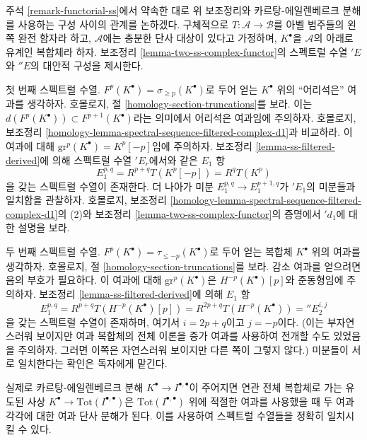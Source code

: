 \begin{remark}
\label{remark-final-functorial}
주석 \ref{remark-functorial-ss}에서 약속한 대로 위 보조정리와
카르탕-에일렌베르크 분해를 사용하는 구성 사이의 관계를 논하겠다.
구체적으로 $T : \mathcal{A} \to \mathcal{B}$를 아벨 범주들의 왼쪽
완전 함자라 하고, $\mathcal{A}$에는 충분한 단사 대상이 있다고
가정하며, $K^\bullet$을 $\mathcal{A}$의 아래로 유계인 복합체라 하자.
보조정리 \ref{lemma-two-ss-complex-functor}의 스펙트럴 수열
${}'E$와 ${}''E$의 대안적 구성을 제시한다.

\medskip\noindent
첫 번째 스펙트럴 수열. $F^p(K^\bullet) =
\sigma_{\geq p}(K^\bullet)$로 두어 얻는 $K^\bullet$ 위의 ``어리석은''
여과를 생각하자. 호몰로지, 절 \ref{homology-section-truncations}를 보라.
이는 $d(F^p(K^\bullet)) \subset F^{p + 1}(K^\bullet)$라는 의미에서
어리석은 여과임에 주의하자. 호몰로지, 보조정리
\ref{homology-lemma-spectral-sequence-filtered-complex-d1}과 비교하라.
이 여과에 대해 $\text{gr}^p(K^\bullet) = K^p[-p]$임에 주의하자.
보조정리 \ref{lemma-ss-filtered-derived}에 의해 스펙트럴 수열
${}'E_r$에서와 같은 $E_1$ 항
$$
E_1^{p, q} = R^{p + q}T(K^p[-p]) = R^qT(K^p)
$$
을 갖는 스펙트럴 수열이 존재한다. 더 나아가 미분
$E_1^{p, q} \to E_1^{p + 1, q}$가 $'{}E_1$의 미분들과 일치함을
관찰하자. 호몰로지, 보조정리
\ref{homology-lemma-spectral-sequence-filtered-complex-d1}의 (2)와
보조정리 \ref{lemma-two-ss-complex-functor}의 증명에서 ${}'d_1$에 대한
설명을 보라.

\medskip\noindent
두 번째 스펙트럴 수열. $F^p(K^\bullet) =
\tau_{\leq -p}(K^\bullet)$로 두어 얻는 복합체 $K^\bullet$ 위의 여과를
생각하자. 호몰로지, 절 \ref{homology-section-truncations}를 보라.
감소 여과를 얻으려면 음의 부호가 필요하다. 이 여과에 대해
$\text{gr}^p(K^\bullet)$은 $H^{-p}(K^\bullet)[p]$와 준동형임에
주의하자. 보조정리 \ref{lemma-ss-filtered-derived}에 의해 $E_1$ 항
$$
E_1^{p, q} = R^{p + q}T(H^{-p}(K^\bullet)[p])
= R^{2p + q}T(H^{-p}(K^\bullet)) = {}''E_2^{i, j}
$$
을 갖는 스펙트럴 수열이 존재하며, 여기서 $i = 2p + q$이고
$j = -p$이다. (이는 부자연스러워 보이지만 여과 복합체의 전체 이론을
증가 여과를 사용하여 전개할 수도 있었음을 주의하자. 그러면 이쪽은
자연스러워 보이지만 다른 쪽이 그렇지 않다.) 미분들이 서로 일치한다는
확인은 독자에게 맡긴다.

\medskip\noindent
실제로 카르탕-에일렌베르크 분해
$K^\bullet \to I^{\bullet, \bullet}$이 주어지면 연관 전체 복합체로
가는 유도된 사상 $K^\bullet \to \text{Tot}(I^{\bullet, \bullet})$은
$\text{Tot}(I^{\bullet, \bullet})$ 위에 적절한 여과를 사용했을 때 두
여과 각각에 대한 여과 단사 분해가 된다. 이를 사용하여 스펙트럴
수열들을 정확히 일치시킬 수 있다.
\end{remark}

